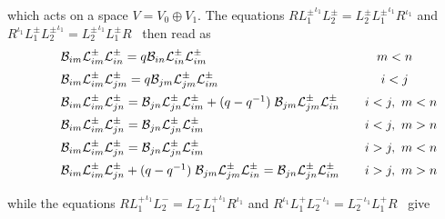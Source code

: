 \documentclass[a4paper,a4paper]{article}
\begin{document}
which acts on a space $V= V_0 \oplus V_1$.
The equations 
$  R {L^\pm_1}^{\iota_1} L^\pm_2 =  L^\pm_2 {L^\pm_1}^{\iota_1} R^{\iota_1} $
and 
$  R^{\iota_1} {L^\pm_1} {L^\pm_2}^{\iota_1} =  
 {L^\pm_2}^{\iota_1} {L^\pm_1} R $
\ then read as
\begin{eqnarray}
  \label{eq:relationsslN}
  \begin{array}{rclc}
&&  {\cal B}_{im}  {\cal L}^\pm_{im} {\cal L}^\pm_{in} 
    = q {\cal B}_{in} {\cal L}^\pm_{in} {\cal L}^\pm_{im}   &  m<n 
    \\[2mm]
&&    {\cal B}_{im} {\cal L}^\pm_{im} {\cal L}^\pm_{jm} = q {\cal B}_{jm} {\cal L}^\pm_{jm}
    {\cal L}^\pm_{im}  &  i<j 
    \\[2mm]
&&    {\cal B}_{im} {\cal L}^\pm_{im} {\cal L}^\pm_{jn} =  
    {\cal B}_{jn} {\cal L}^\pm_{jn} {\cal L}^\pm_{im}  
    + (q-q^{-1})\; {\cal B}_{jm} {\cal L}^\pm_{jm} {\cal L}^\pm_{in} & \quad i<j,\ m<n\\[2mm]
&&    {\cal B}_{im} {\cal L}^\pm_{im} {\cal L}^\pm_{jn} =  
    {\cal B}_{jn} {\cal L}^\pm_{jn} {\cal L}^\pm_{im}  
    &\quad  i<j,\ m>n \\[2mm]
&&    {\cal B}_{im} {\cal L}^\pm_{im} {\cal L}^\pm_{jn}  =  
    {\cal B}_{jn} {\cal L}^\pm_{jn} {\cal L}^\pm_{im}   & \quad i>j, \ m<n \\[2mm]
&&    {\cal B}_{im} {\cal L}^\pm_{im} {\cal L}^\pm_{jn} 
    + (q-q^{-1})\; {\cal B}_{jm} {\cal L}^\pm_{jm} {\cal L}^\pm_{in}  =  
    {\cal B}_{jn} {\cal L}^\pm_{jn} {\cal L}^\pm_{im}  
    &\quad  i>j, \ m>n \\[2mm]
  \end{array}
\end{eqnarray}
while the equations 
$  R {L^+_1}^{\iota_1} L^-_2 =  L^-_2 {L^+_1}^{\iota_1} R^{\iota_1} $
and 
$  R^{\iota_1} {L^+_1} {L^-_2}^{\iota_1} =  {L^-_2}^{\iota_1} {L^+_1} R $
\ give
\end{document}
